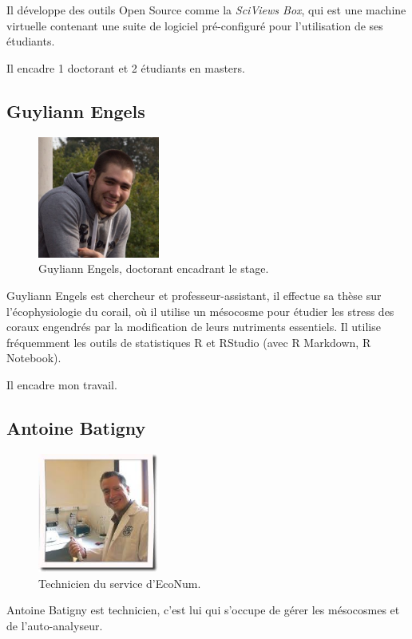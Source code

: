 \documentclass[]{article}
\begin{document}
Il développe des outils Open Source comme la \emph{SciViews Box}, qui
est une machine virtuelle contenant une suite de logiciel pré-configuré
pour l'utilisation de ses étudiants.

Il encadre 1 doctorant et 2 étudiants en masters.

\subsection{Guyliann Engels}\label{guyliann-engels}

\begin{figure}[H]
\includegraphics[width=4cm]{../image/Guyliann.jpg}
\caption{Guyliann Engels, doctorant encadrant le stage.}
\end{figure}

Guyliann Engels est chercheur et professeur-assistant, il effectue sa
thèse sur l'écophysiologie du corail, où il utilise un mésocosme pour
étudier les stress des coraux engendrés par la modification de leurs
nutriments essentiels. Il utilise fréquemment les outils de statistiques
R et RStudio (avec R Markdown, R Notebook).

Il encadre mon travail.

\subsection{Antoine Batigny}\label{antoine-batigny}

\begin{figure}[h!]
\includegraphics[width=4cm]{../image/antoine2.jpg}
\caption{Technicien du service d'EcoNum.}
\end{figure}

Antoine Batigny est technicien, c'est lui qui s'occupe de gérer les
mésocosmes et de l'auto-analyseur.
\end{document}
